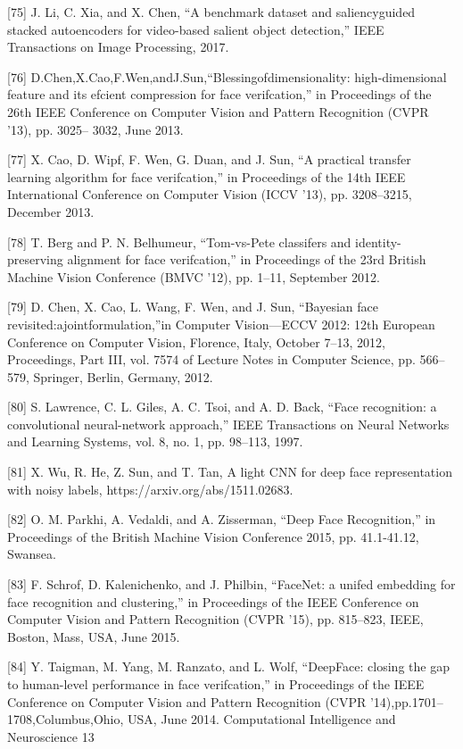 \documentclass[a4paper]{article}
\begin{document}
[75] J. Li, C. Xia, and X. Chen, “A benchmark dataset and saliencyguided stacked autoencoders for video-based salient object
detection,” IEEE Transactions on Image Processing, 2017.


[76] D.Chen,X.Cao,F.Wen,andJ.Sun,“Blessingofdimensionality:
high-dimensional feature and its efcient compression for face
verifcation,” in Proceedings of the 26th IEEE Conference on
Computer Vision and Pattern Recognition (CVPR ’13), pp. 3025–
3032, June 2013.


[77] X. Cao, D. Wipf, F. Wen, G. Duan, and J. Sun, “A practical transfer learning algorithm for face verifcation,” in Proceedings of the
14th IEEE International Conference on Computer Vision (ICCV
’13), pp. 3208–3215, December 2013.


[78] T. Berg and P. N. Belhumeur, “Tom-vs-Pete classifers and identity-preserving alignment for face verifcation,” in Proceedings
of the 23rd British Machine Vision Conference (BMVC ’12), pp.
1–11, September 2012.


[79] D. Chen, X. Cao, L. Wang, F. Wen, and J. Sun, “Bayesian face
revisited:ajointformulation,”in Computer Vision—ECCV 2012:
12th European Conference on Computer Vision, Florence, Italy,
October 7–13, 2012, Proceedings, Part III, vol. 7574 of Lecture
Notes in Computer Science, pp. 566–579, Springer, Berlin,
Germany, 2012.


[80] S. Lawrence, C. L. Giles, A. C. Tsoi, and A. D. Back, “Face
recognition: a convolutional neural-network approach,” IEEE
Transactions on Neural Networks and Learning Systems, vol. 8,
no. 1, pp. 98–113, 1997.


[81] X. Wu, R. He, Z. Sun, and T. Tan, A light CNN for deep face representation with noisy labels, https://arxiv.org/abs/1511.02683.


[82] O. M. Parkhi, A. Vedaldi, and A. Zisserman, “Deep Face Recognition,” in Proceedings of the British Machine Vision Conference
2015, pp. 41.1-41.12, Swansea.


[83] F. Schrof, D. Kalenichenko, and J. Philbin, “FaceNet: a unifed
embedding for face recognition and clustering,” in Proceedings
of the IEEE Conference on Computer Vision and Pattern Recognition (CVPR ’15), pp. 815–823, IEEE, Boston, Mass, USA, June
2015.


[84] Y. Taigman, M. Yang, M. Ranzato, and L. Wolf, “DeepFace: closing the gap to human-level performance in face verifcation,”
in Proceedings of the IEEE Conference on Computer Vision and
Pattern Recognition (CVPR ’14),pp.1701–1708,Columbus,Ohio,
USA, June 2014.
Computational Intelligence and Neuroscience 13
\end{document}
